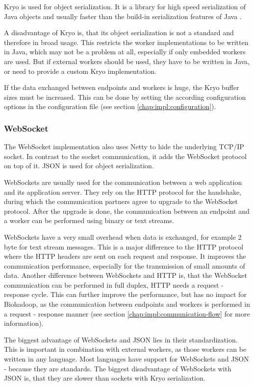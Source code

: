 Kryo \cite{kryo} is used for object serialization. It is a library for high speed serialization of Java objects and usually faster than the build-in serialization features of Java \cite{jvm-serializers}.

A disadvantage of Kryo is, that its object serialization is not a standard and therefore in broad usage. This restricts the worker implementations to be written in Java, which may not be a problem at all, especially if only embedded workers are used. But if external workers should be used, they have to be written in Java, or need to provide a custom Kryo implementation.

If the data exchanged between endpoints and workers is huge, the Kryo buffer sizes must be increased. This can be done by setting the according configuration options in the configuration file (see section \ref{chap:impl:configuration}).

\subsubsection{WebSocket}
The WebSocket implementation also uses Netty to hide the underlying TCP/IP socket. In contrast to the socket communication, it adds the WebSocket protocol on top of it. JSON is used for object serialization.

WebSockets are usually used for the communication between a web application and its application server. They rely on the HTTP protocol for the handshake, during which the communication partners agree to upgrade to the WebSocket protocol. After the upgrade is done, the communication between an endpoint and a worker can be performed using binary or text streams.

WebSockets have a very small overhead when data is exchanged, for example 2 byte for text stream messages. This is a major difference to the HTTP protocol where the HTTP headers are sent on each request and response. It improves the communication performance, especially for the transmission of small amounts of data. Another difference between WebSockets and HTTP is, that the WebSocket communication can be performed in full duplex, HTTP needs a request - response cycle. This can further improve the performance, but has no impact for Biohadoop, as the communication between endpoints and workers is performed in a request - response manner (see section \ref{chap:impl:communication-flow} for more information).

The biggest advantage of WebSockets and JSON lies in their standardization. This is important in combination with external workers, as those workers can be written in any language. Most languages have support for WebSockets and JSON - because they are standards. The biggest disadvantage of WebSockets with JSON is, that they are slower than sockets with Kryo serialization.

